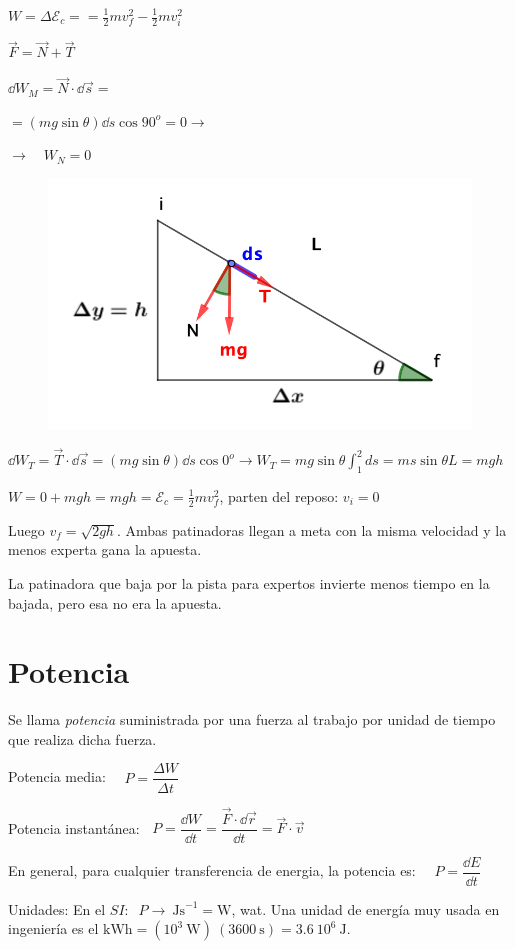 \begin{multicols}{2}
	$W=\Delta \mathcal E_c==\frac 1 2 m v_f^2-\frac 1 2 m v_i^2$
	
	$\vec F=\vec N+\vec T$
	
	$\dd W _M=\vec N \cdot \dd \vec s=$
	
	$=(mg\sin \theta) \dd s \cos 90^o=0\to $ 
	
	$\to \quad W_N=0$
	\begin{figure}[H]
		\centering
		\includegraphics[width=.55\textwidth]{imagenes/imagenes03/T03IM47.png}
		\end{figure}
\end{multicols}
\vspace{-5mm}$\dd W_T= \vec T \cdot \dd \vec s=(mg \sin \theta) \dd s \cos 0^o \to W_T=mg\sin \theta \int_1^2 ds
=ms \sin \theta L=mgh$

$W=0+mgh=mgh=\mathcal E_c=\frac 1 2 m v_f^2$, parten del reposo: $v_i=0$

Luego $v_f=\sqrt{2gh}$. Ambas patinadoras llegan a meta con la misma velocidad y la menos experta gana la apuesta.

\textcolor{gris}{La patinadora que baja por la pista para expertos invierte menos tiempo en la bajada, pero esa no era la apuesta.}

\section{Potencia}

Se llama \emph{potencia} suministrada por una fuerza al trabajo por unidad de tiempo que realiza dicha fuerza. 

Potencia media: $\quad P=\dfrac{\Delta W}{\Delta t}$

Potencia instantánea: $\;\; P=\dfrac {\dd W}{\dd t}=\dfrac {\vec F \cdot \dd \vec r}{\dd t}=\vec F \cdot \vec v$

En general, para cualquier transferencia de energia, la potencia es: $\quad P=\dfrac{\dd E}{\dd t}$

Unidades: En el $SI:\;\; P\to  \ \mathrm{J s}^{-1} = \mathrm{W}$, wat. Una unidad de energía muy usada en ingeniería es el $\mathrm{kWh}=(10^3\ \mathrm{W})\ (3600\ \mathrm{s})=3.6\ 10^6 \ \mathrm{J}$.

